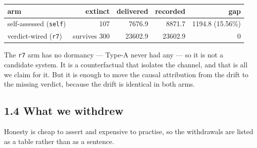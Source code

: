 \documentclass[11pt,a4paper]{article}
\newcounter{none}
\begin{document}
{\def\LTcaptype{none} %
\begin{longtable}[]{@{}lrrrr@{}}
\toprule\noalign{}
arm & extinct & delivered & recorded & gap \\
\midrule\noalign{}
\endhead
\bottomrule\noalign{}
\endlastfoot
self-assessed (\texttt{self}) & 107 & 7676.9 & 8871.7 & 1194.8 (15.56\%) \\
verdict-wired (\texttt{r7}) & survives 300 & 23602.9 & 23602.9 & 0 \\
\end{longtable}
}

The \texttt{r7} arm has no dormancy --- Type-A never had any --- so it is not a candidate
system. It is a counterfactual that isolates the channel, and that is all we
claim for it. But it is enough to move the causal attribution from the drift to
the missing verdict, because the drift is identical in both arms.

\subsection{1.4 What we withdrew}\label{what-we-withdrew}

Honesty is cheap to assert and expensive to practise, so the withdrawals are
listed as a table rather than as a sentence.
\end{document}
